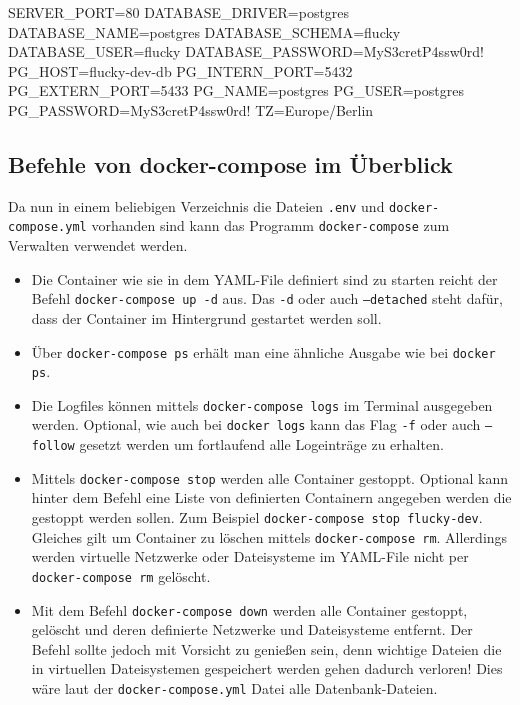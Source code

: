 \begin{bashcode}
  SERVER_PORT=80
  DATABASE_DRIVER=postgres
  DATABASE_NAME=postgres
  DATABASE_SCHEMA=flucky
  DATABASE_USER=flucky
  DATABASE_PASSWORD=MyS3cretP4ssw0rd!
  PG_HOST=flucky-dev-db
  PG_INTERN_PORT=5432
  PG_EXTERN_PORT=5433
  PG_NAME=postgres
  PG_USER=postgres
  PG_PASSWORD=MyS3cretP4ssw0rd!
  TZ=Europe/Berlin
\end{bashcode}

\subsection{Befehle von docker-compose im Überblick}%
\label{sec:docker-compose.befehle}
Da nun in einem beliebigen Verzeichnis die Dateien \texttt{.env} und \texttt{docker-compose.yml} vorhanden sind kann das Programm \texttt{docker-compose} zum Verwalten verwendet werden.

\begin{itemize}[itemsep=0pt]
  \item Die Container wie sie in dem YAML-File definiert sind zu starten reicht der Befehl \texttt{docker-compose up -d} aus. Das \texttt{-d} oder auch \texttt{--detached} steht dafür, dass der Container im Hintergrund gestartet werden soll.
  \item Über \texttt{docker-compose ps} erhält man eine ähnliche Ausgabe wie bei \texttt{docker ps}.
  \item Die Logfiles können mittels \texttt{docker-compose logs} im Terminal ausgegeben werden. Optional, wie auch bei \texttt{docker logs} kann das Flag \texttt{-f} oder auch \texttt{--follow} gesetzt werden um fortlaufend alle Logeinträge zu erhalten.
  \item Mittels \texttt{docker-compose stop} werden alle Container gestoppt. Optional kann hinter dem Befehl eine Liste von definierten Containern angegeben werden die gestoppt werden sollen. Zum Beispiel \texttt{docker-compose stop flucky-dev}. Gleiches gilt um Container zu löschen mittels \texttt{docker-compose rm}. Allerdings werden virtuelle Netzwerke oder Dateisysteme im YAML-File nicht per \texttt{docker-compose rm} gelöscht.
  \item Mit dem Befehl \texttt{docker-compose down} werden alle Container gestoppt, gelöscht und deren definierte Netzwerke und Dateisysteme entfernt. Der Befehl sollte jedoch mit Vorsicht zu genießen sein, denn wichtige Dateien die in virtuellen Dateisystemen gespeichert werden gehen dadurch verloren! Dies wäre laut der \texttt{docker-compose.yml} Datei alle Datenbank-Dateien.
\end{itemize}

